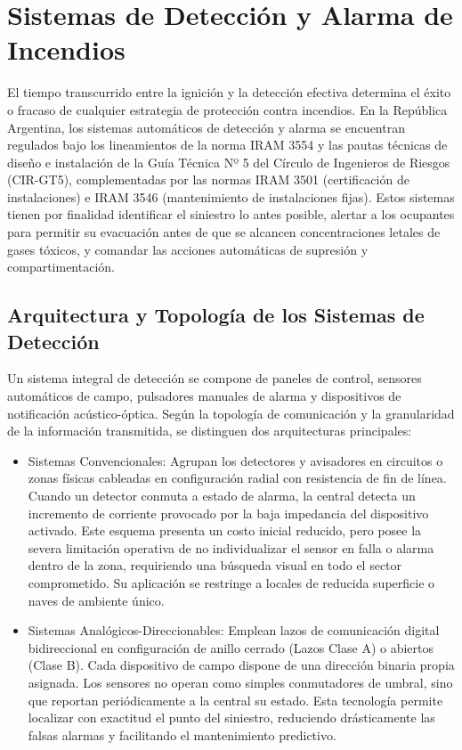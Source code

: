 \chapter{Sistemas de Detección y Alarma de Incendios}
\label{sec.cap5:sistemas_deteccion}

El tiempo transcurrido entre la ignición y la detección efectiva determina el éxito o fracaso de cualquier
estrategia de protección contra incendios. En la República Argentina, los sistemas automáticos de detección y alarma se
encuentran regulados bajo los lineamientos de la norma IRAM 3554 y las pautas técnicas de diseño e instalación de la
Guía Técnica Nº 5 del Círculo de Ingenieros de Riesgos (CIR-GT5), complementadas por las normas IRAM 3501 (certificación
de instalaciones) e IRAM 3546 (mantenimiento de instalaciones fijas). Estos sistemas tienen por finalidad identificar el
siniestro lo antes posible, alertar a los ocupantes para permitir su evacuación antes de que se alcancen concentraciones
letales de gases tóxicos, y comandar las acciones automáticas de supresión y compartimentación.

\section{Arquitectura y Topología de los Sistemas de Detección}

Un sistema integral de detección se compone de paneles de control, sensores
automáticos de campo, pulsadores manuales de alarma y dispositivos de notificación acústico-óptica. Según la topología de
comunicación y la granularidad de la información transmitida, se distinguen dos arquitecturas principales:

\begin{itemize}
    \item Sistemas Convencionales: Agrupan los detectores y avisadores en circuitos o zonas físicas cableadas en
          configuración radial con resistencia de fin de línea. Cuando un detector conmuta a estado de alarma, la central
          detecta un incremento de corriente provocado por la baja impedancia del dispositivo activado. Este esquema
          presenta un costo inicial reducido, pero posee la severa limitación operativa de no individualizar el sensor en
          falla o alarma dentro de la zona, requiriendo una búsqueda visual en todo el sector comprometido. Su aplicación se
          restringe a locales de reducida superficie o naves de ambiente único.
    \item Sistemas Analógicos-Direccionables: Emplean lazos de comunicación digital bidireccional en configuración de
          anillo cerrado (Lazos Clase A) o abiertos (Clase B). Cada dispositivo de campo dispone de una dirección
          binaria propia asignada. Los sensores no operan como simples conmutadores de umbral, sino que reportan
          periódicamente a la central su estado. Esta tecnología permite localizar con exactitud
          el punto del siniestro, reduciendo drásticamente las falsas alarmas y facilitando el mantenimiento predictivo.
\end{itemize}

